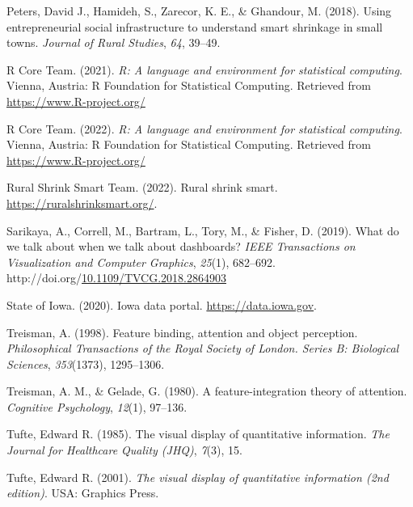 \documentclass[print]{nuthesis}
\newlength{\cslhangindent}
\newenvironment{CSLReferences}[2]%
{\setlength{\parindent}{0pt}%
\everypar{\setlength{\hangindent}{\cslhangindent}}\ignorespaces}%
{\par}
\begin{document}
\begin{CSLReferences}{1}{0}
\leavevmode{}%
Peters, David J., Hamideh, S., Zarecor, K. E., \& Ghandour, M. (2018). Using entrepreneurial social infrastructure to understand smart shrinkage in small towns. \emph{Journal of Rural Studies}, \emph{64}, 39--49.

\leavevmode{}%
R Core Team. (2021). \emph{R: A language and environment for statistical computing}. Vienna, Austria: R Foundation for Statistical Computing. Retrieved from \url{https://www.R-project.org/}

\leavevmode{}%
R Core Team. (2022). \emph{R: A language and environment for statistical computing}. Vienna, Austria: R Foundation for Statistical Computing. Retrieved from \url{https://www.R-project.org/}

\leavevmode{}%
Rural Shrink Smart Team. (2022). Rural shrink smart. \url{https://ruralshrinksmart.org/}.

\leavevmode{}%
Sarikaya, A., Correll, M., Bartram, L., Tory, M., \& Fisher, D. (2019). What do we talk about when we talk about dashboards? \emph{IEEE Transactions on Visualization and Computer Graphics}, \emph{25}(1), 682--692. http://doi.org/\href{https://doi.org/10.1109/TVCG.2018.2864903}{10.1109/TVCG.2018.2864903}

\leavevmode{}%
State of Iowa. (2020). Iowa data portal. \url{https://data.iowa.gov}.

\leavevmode{}%
Treisman, A. (1998). Feature binding, attention and object perception. \emph{Philosophical Transactions of the Royal Society of London. Series B: Biological Sciences}, \emph{353}(1373), 1295--1306.

\leavevmode{}%
Treisman, A. M., \& Gelade, G. (1980). A feature-integration theory of attention. \emph{Cognitive Psychology}, \emph{12}(1), 97--136.

\leavevmode{}%
Tufte, Edward R. (1985). The visual display of quantitative information. \emph{The Journal for Healthcare Quality (JHQ)}, \emph{7}(3), 15.

\leavevmode{}%
Tufte, Edward R. (2001). \emph{The visual display of quantitative information (2nd edition)}. USA: Graphics Press.


\end{CSLReferences}
\end{document}
